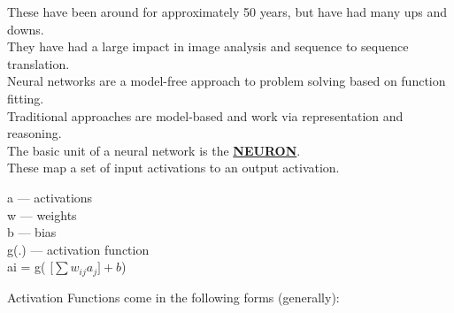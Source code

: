\documentclass[../../lecture_notes.tex]{subfiles}
\begin{document}
\noindent These have been around for approximately 50 years, but have had many ups and downs.\\
They have had a large impact in image analysis and sequence to sequence translation.\\
Neural networks are a model-free approach to problem solving based on function fitting.\\
Traditional approaches are model-based and work via representation and reasoning.\\

\noindent The basic unit of a neural network is the \textbf{\underline{NEURON}}.\\
These map a set of input activations to an output activation.

\begin{minipage}{0.6\textwidth}\end{minipage}%
\begin{minipage}{0.4\textwidth}
\noindent a — activations\\
w — weights\\
b — bias\\
g(.) — activation function\\
ai = g( [$\sum w_{ij} a_j] + b$)
\end{minipage}\bigskip

\noindent Activation Functions come in the following forms (generally):\\\bigskip\bigskip
\end{document}
